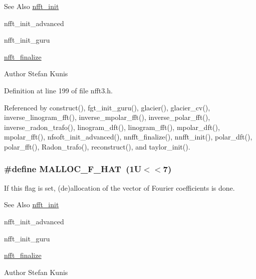 \begin{DoxySeeAlso}{See Also}
\hyperlink{group__nfft_ga1dfeaf18f3735f035afa62ca768d99c4}{nfft\-\_\-init} 

nfft\-\_\-init\-\_\-advanced 

nfft\-\_\-init\-\_\-guru 

\hyperlink{group__nfft_ga614f9f7af5b0d5491afa9495393c4dc3}{nfft\-\_\-finalize} 
\end{DoxySeeAlso}
\begin{DoxyAuthor}{Author}
Stefan Kunis 
\end{DoxyAuthor}


Definition at line 199 of file nfft3.\-h.



Referenced by construct(), fgt\-\_\-init\-\_\-guru(), glacier(), glacier\-\_\-cv(), inverse\-\_\-linogram\-\_\-fft(), inverse\-\_\-mpolar\-\_\-fft(), inverse\-\_\-polar\-\_\-fft(), inverse\-\_\-radon\-\_\-trafo(), linogram\-\_\-dft(), linogram\-\_\-fft(), mpolar\-\_\-dft(), mpolar\-\_\-fft(), nfsoft\-\_\-init\-\_\-advanced(), nnfft\-\_\-finalize(), nnfft\-\_\-init(), polar\-\_\-dft(), polar\-\_\-fft(), Radon\-\_\-trafo(), reconstruct(), and taylor\-\_\-init().

\hypertarget{group__nfft_ga02d52cb02b6cfdbc3e4d5fd4de1aef9e}{
\subsubsection[{M\-A\-L\-L\-O\-C\-\_\-\-F\-\_\-\-H\-A\-T}]{\setlength{\rightskip}{0pt plus 5cm}\#define M\-A\-L\-L\-O\-C\-\_\-\-F\-\_\-\-H\-A\-T~(1\-U$<$$<$7)}}\label{group__nfft_ga02d52cb02b6cfdbc3e4d5fd4de1aef9e}
If this flag is set, (de)allocation of the vector of Fourier coefficients is done.

\begin{DoxySeeAlso}{See Also}
\hyperlink{group__nfft_ga1dfeaf18f3735f035afa62ca768d99c4}{nfft\-\_\-init} 

nfft\-\_\-init\-\_\-advanced 

nfft\-\_\-init\-\_\-guru 

\hyperlink{group__nfft_ga614f9f7af5b0d5491afa9495393c4dc3}{nfft\-\_\-finalize} 
\end{DoxySeeAlso}
\begin{DoxyAuthor}{Author}
Stefan Kunis 
\end{DoxyAuthor}


